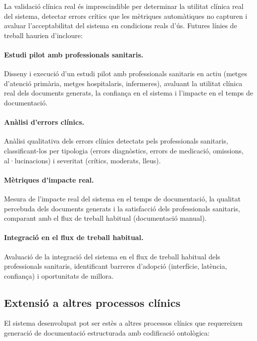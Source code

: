 \documentclass[CAT]{TFUOC}%
\begin{document}
La validació clínica real és imprescindible per determinar la utilitat clínica real del sistema, detectar errors crítics que les mètriques automàtiques no capturen i avaluar l'acceptabilitat del sistema en condicions reals d'ús. Futures línies de treball haurien d'incloure:

\paragraph{Estudi pilot amb professionals sanitaris.}
Disseny i execució d'un estudi pilot amb professionals sanitaris en actiu (metges d'atenció primària, metges hospitalaris, infermeres), avaluant la utilitat clínica real dels documents generats, la confiança en el sistema i l'impacte en el temps de documentació.

\paragraph{Anàlisi d'errors clínics.}
Anàlisi qualitativa dels errors clínics detectats pels professionals sanitaris, classificant-los per tipologia (errors diagnòstics, errors de medicació, omissions, al·lucinacions) i severitat (crítics, moderats, lleus).

\paragraph{Mètriques d'impacte real.}
Mesura de l'impacte real del sistema en el temps de documentació, la qualitat percebuda dels documents generats i la satisfacció dels professionals sanitaris, comparant amb el flux de treball habitual (documentació manual).

\paragraph{Integració en el flux de treball habitual.}
Avaluació de la integració del sistema en el flux de treball habitual dels professionals sanitaris, identificant barreres d'adopció (interfície, latència, confiança) i oportunitats de millora.

\subsection{Extensió a altres processos clínics}

El sistema desenvolupat pot ser estès a altres processos clínics que requereixen generació de documentació estructurada amb codificació ontològica:
\end{document}
